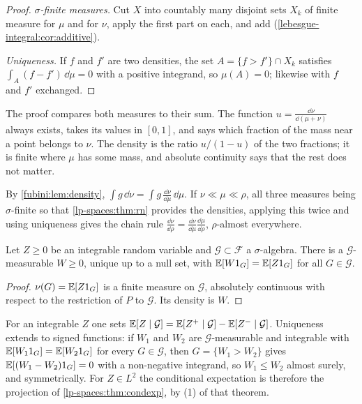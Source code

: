 \begin{notechapter}
\begin{proof}
\emph{$\sigma$-finite measures.} Cut $X$ into countably many disjoint
sets $X_k$ of finite measure for $\mu$ and for $\nu$, apply the first
part on each, and add (\cref{lebesgue-integral:cor:additive}).

\emph{Uniqueness.} If $f$ and $f'$ are two densities, the set
$A = \{f > f'\}\cap X_k$ satisfies $\int_A(f - f')\,\dd\mu = 0$ with a
positive integrand, so $\mu(A) = 0$; likewise with $f$ and $f'$
exchanged.
\end{proof}

\begin{intuition}
The proof compares both measures to their sum. The function
$u = \frac{\dd\nu}{\dd(\mu + \nu)}$ always exists, takes its values in
$[0, 1]$, and says which fraction of the mass near a point belongs to
$\nu$. The density is the ratio $u/(1 - u)$ of the two fractions; it is
finite where $\mu$ has some mass, and absolute continuity says that the
rest does not matter.
\end{intuition}

By \cref{fubini:lem:density}, $\int g\,\dd\nu = \int g\,
\frac{\dd\nu}{\dd\mu}\,\dd\mu$. If $\nu\ll\mu\ll\rho$, all three
measures being $\sigma$-finite so that \cref{lp-spaces:thm:rn}
provides the densities, applying this twice
and using uniqueness gives the chain rule
$\frac{\dd\nu}{\dd\rho} = \frac{\dd\nu}{\dd\mu}\frac{\dd\mu}{\dd\rho}$,
$\rho$-almost everywhere.

\begin{corollary}
\label{lp-spaces:cor:condexp}
Let $Z\geq0$ be an integrable random variable and
$\mathcal G\subset\mathcal F$ a $\sigma$-algebra. There is a
$\mathcal G$-measurable $W\geq0$, unique up to a null set, with
$\mathbb{E}[W1_G] = \mathbb{E}[Z1_G]$ for all $G\in\mathcal G$.
\end{corollary}

\begin{proof}
$\nu(G) = \mathbb{E}[Z1_G]$ is a finite measure on $\mathcal G$, absolutely
continuous with respect to the restriction of $P$ to $\mathcal G$. Its
density is $W$.
\end{proof}

For an integrable $Z$ one sets
$\mathbb{E}[Z\mid\mathcal G] = \mathbb{E}[Z^+\mid\mathcal G] - \mathbb{E}[Z^-\mid\mathcal G]$.
Uniqueness extends to signed functions: if $W_1$ and $W_2$ are
$\mathcal G$-measurable and integrable with
$\mathbb{E}[W_11_G] = \mathbb{E}[W_21_G]$ for every $G\in\mathcal G$, then
$G = \{W_1 > W_2\}$ gives $\mathbb{E}[(W_1 - W_2)1_G] = 0$ with a non-negative
integrand, so $W_1\leq W_2$ almost surely, and symmetrically. For
$Z\in L^2$ the conditional expectation is therefore the projection of
\cref{lp-spaces:thm:condexp}, by (1) of that theorem.


\end{notechapter}
